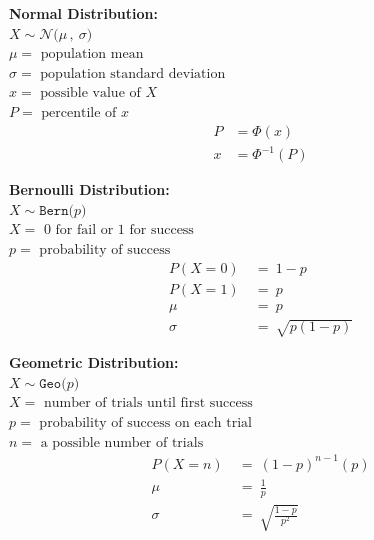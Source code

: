 \documentclass[12pt,letterpaper,addpoints]{exam}
\begin{document}
\newcommand{\N}[2]{\mathcal{N}\big(#1\,,~#2\big)}
\newcommand{\Bern}[1]{\texttt{Bern}\big(#1\big)}
\newcommand{\Geo}[1]{\texttt{Geo}\big(#1\big)}
\newcommand{\B}[2]{\mathcal{B}\big(#1\,,~#2\big)}
\newcommand{\Sampp}[2]{\texttt{Samp}_{\hat{p}}\big(#1,~#2\big)}

\newpage

\begin{multicols}{2}


{\bf Normal Distribution:}\\
$X \sim \N{\mu}{\sigma}$\\
$\mu = \text{ population mean} $\\
$\sigma = \text{ population standard deviation} $\\
$x = \text{ possible value of }X $\\
$P = \text{ percentile of } x$
\begin{align*}
P &= \Phi(x)\\
x &= \Phi^{-1}(P)
\end{align*}

{\bf Bernoulli Distribution:}\\
$X \sim \Bern{p} $\\
$X = \text{ 0 for fail or 1 for success}$\\
$p = \text{ probability of success}$
\begin{align*}
P(X=0) ~&=~ 1-p \\
P(X=1) ~&=~ p \\
\mu ~&=~ p\\
\sigma ~&=~ \sqrt{p(1-p)}
\end{align*}

{\bf Geometric Distribution:}\\
$X \sim \Geo{p}$ \\
$X = \text{ number of trials until first success}$\\
$p = \text{ probability of success on each trial}$\\
$n = \text{ a possible number of trials}$
\begin{align*}
P(X=n) ~&=~ (1-p)^{n-1}(p)\\
\mu ~&=~ \frac{1}{p}\\
\sigma ~&=~ \sqrt{\frac{1-p}{p^2}} 
\end{align*}


\end{multicols}
\end{document}
